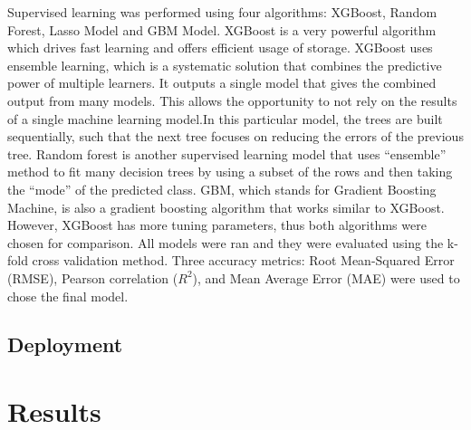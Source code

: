 \documentclass[11pt,]{article}
\begin{document}
Supervised learning was performed using four algorithms: XGBoost, Random
Forest, Lasso Model and GBM Model. XGBoost is a very powerful algorithm
which drives fast learning and offers efficient usage of storage.
XGBoost uses ensemble learning, which is a systematic solution that
combines the predictive power of multiple learners. It outputs a single
model that gives the combined output from many models. This allows the
opportunity to not rely on the results of a single machine learning
model.In this particular model, the trees are built sequentially, such
that the next tree focuses on reducing the errors of the previous tree.
Random forest is another supervised learning model that uses
``ensemble'' method to fit many decision trees by using a subset of the
rows and then taking the ``mode'' of the predicted class. GBM, which
stands for Gradient Boosting Machine, is also a gradient boosting
algorithm that works similar to XGBoost. However, XGBoost has more
tuning parameters, thus both algorithms were chosen for comparison. All
models were ran and they were evaluated using the k-fold cross
validation method. Three accuracy metrics: Root Mean-Squared Error
(RMSE), Pearson correlation (\(R^2\)), and Mean Average Error (MAE) were
used to chose the final model.

\hypertarget{deployment}{%
\subsection{Deployment}\label{deployment}}

\hypertarget{results}{%
\section{Results}\label{results}}
\end{document}
